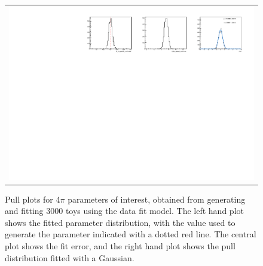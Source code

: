 \begin{figure}
\begin{tabular}{c}
\includegraphics[width=\textwidth]{ANA_resources/Plots/Data_fit/FitterBias//N_Bs_pipipipi_run2.pdf} \\
  \end{tabular}
  \caption{Pull plots for 4$\pi$ parameters of interest, obtained from generating and fitting 3000 toys using the data fit model. The left hand plot shows the fitted parameter distribution, with the value used to generate the parameter indicated with a dotted red line. The central plot shows the fit error, and the right hand plot shows the pull distribution fitted with a Gaussian.}
\label{fig:4pi_pulls}
\end{figure}
